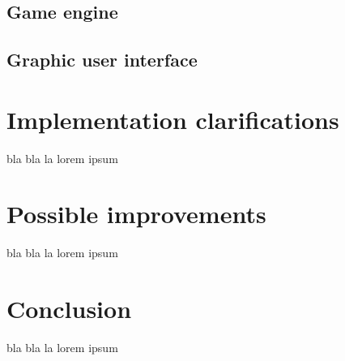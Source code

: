 \documentclass[a4paper]{article}
\begin{document}
	\subsection{Game engine}
	\subsection{Graphic user interface}


\section{Implementation clarifications}
bla bla la lorem ipsum

\section{Possible improvements}
bla bla la lorem ipsum

\section*{Conclusion}
bla bla la lorem ipsum
\end{document}
